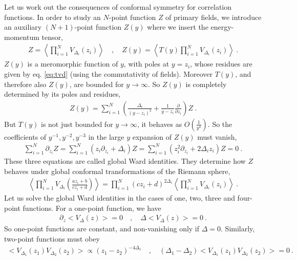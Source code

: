 \documentclass[12pt, a4paper]{article}
\theoremstyle{break}
\begin{document}
Let us work out the consequences of conformal symmetry for correlation functions.
In order to study an $N$-point function $Z$ of primary fields, we introduce an auxiliary $(N+1)$-point function $Z(y)$ where we insert the energy-momentum tensor,
\begin{align}
 Z = \left< \prod_{i=1}^N V_{\Delta_i}(z_i) \right> \quad , \quad Z(y) = \left< T(y) \prod_{i=1}^N V_{\Delta_i}(z_i) \right> \ .
\end{align}
$Z(y)$ is a meromorphic function of $y$, with poles at $y=z_i$, whose residues are given by eq. \eqref{eq:tvd} (using the commutativity of fields).
Moreover $T(y)$, and therefore also $Z(y)$, are bounded for $y\to \infty$. So $Z(y)$ is completely determined by its poles and residues,
\begin{align}
 Z(y) = \sum_{i=1}^N \left(\frac{\Delta_i}{(y-z_i)^2} +\frac{1}{y-z_i}\frac{\partial}{\partial z_i}\right) Z\ .
 \label{eq:zy}
\end{align}
But $T(y)$ is not just bounded for $y\to \infty$, it behaves as $O(\frac{1}{y^4})$.
So the coefficients of $y^{-1}, y^{-2}, y^{-3}$ in the large $y$ expansion of $Z(y)$ must vanish, 
\begin{align}
 \sum_{i=1}^N \partial_{z_i} Z = \sum_{i=1}^N \left(z_i \partial_{z_i} + \Delta_i\right) Z = \sum_{i=1}^N \left(z_i^2 \partial_{z_i} + 2\Delta_iz_i\right) Z = 0\ .
 \label{eq:gward}
\end{align}
These three equations are called global Ward identities. They determine how $Z$ behaves under global conformal transformations of the Riemann sphere,
\begin{align}
 \left< \prod_{i=1}^N  V_{\Delta_i}\left(\frac{az_i+b}{cz_i+d}\right) \right>
 = \prod_{i=1}^N (cz_i +d)^{2\Delta_i} \left< \prod_{i=1}^N V_{\Delta_i}(z_i) \right>\ .
 \label{eq:zgc}
\end{align}
Let us solve the global Ward identities in the cases of one, two, three and four-point functions. For a one-point function, we have 
\begin{align}
\partial_z \Big< V_\Delta(z)\Big> = 0 \quad , \quad \Delta \Big< V_\Delta(z)\Big> = 0\ .
\end{align}
So one-point functions are constant, and non-vanishing only if $\Delta=0$. Similarly, two-point functions must obey
\begin{align}
 \Big< V_{\Delta_1}(z_1)V_{\Delta_2}(z_2) \Big> \propto (z_1-z_2)^{-4\Delta_1} \quad , \quad (\Delta_1-\Delta_2)\Big< V_{\Delta_1}(z_1)V_{\Delta_2}(z_2) \Big>  = 0\ .
\end{align}
\end{document}
